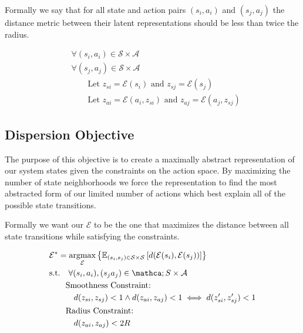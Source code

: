 \documentclass{article}
\DeclareMathOperator*{\argmax}{argmax}
\begin{document}
\noindent
Formally we say that for all state and action pairs $(s_i, a_i)$ and $(s_j, a_j)$ the distance metric between their latent representations should be less than twice the radius.

\begin{align*}
     & \forall(s_i, a_i) \in \mathcal{S} \times \mathcal{A}                                                \\
     & \forall(s_j, a_j) \in \mathcal{S} \times \mathcal{A}                                                \\
     & \qquad \text{Let } z_{si} = \mathcal{E}(s_i) \text{ and } z_{sj} = \mathcal{E}(s_j)                 \\
     & \qquad \text{Let } z_{ai} = \mathcal{E}(a_i, z_{si}) \text{ and } z_{aj} = \mathcal{E}(a_j, z_{sj})
\end{align*}

\subsection*{Dispersion Objective}

The purpose of this objective is to create a maximally abstract representation of our system states given the constraints on the action space.
By maximizing the number of state neighborhoods we force the representation to find the most abstracted form of our limited number of actions which best explain all of the possible state transitions.

\noindent
Formally we want our $\mathcal{E}$ to be the one that maximizes the distance between all state transitions while satisfying the constraints.

\begin{align*}
     & \mathcal{E}^* = \argmax_\mathcal{E} \left\{\mathbb{E}_{(s_i, s_j) \in \mathcal{S} \times \mathcal{S}} \left[ d(\mathcal{E}(s_i), \mathcal{E}(s_j)) \right] \right\} \\
     & \text{s.t.} \quad \forall (s_i, a_i), (s_j a_j) \in \mathca;{S} \times \mathcal{A} \\
     & \quad\quad\text{Smoothness Constraint: } \\
     & \quad\quad\quad d(z_{si}, z_{sj}) < 1 \land d(z_{ai}, z_{aj}) < 1 \iff d(z_{si}', z_{sj}') < 1 \\
     & \quad\quad\text{Radius Constraint: } \\
     & \quad\quad\quad d(z_{ai}, z_{aj}) < 2R
\end{align*}
\end{document}
